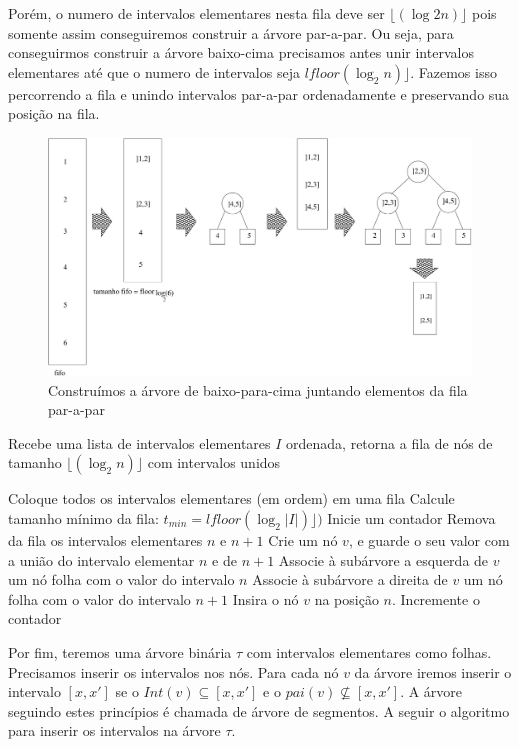 Porém, o numero de intervalos elementares nesta fila deve ser $\lfloor(\log{2}n)\rfloor$ pois somente assim conseguiremos construir a árvore par-a-par. Ou seja, para conseguirmos construir a árvore baixo-cima precisamos antes unir intervalos elementares até que o numero de intervalos seja $lfloor(\log_2{n})\rfloor$. Fazemos isso percorrendo a fila e unindo intervalos par-a-par ordenadamente e preservando sua posição na fila.

\begin{figure}[h!]
    \centering
    \includegraphics[scale=0.6]{images/fifo_update.pdf}
    \caption{Construímos a árvore de baixo-para-cima juntando elementos da fila par-a-par}
    \label{fig:my_label}
\end{figure}

\begin{algorithm}[h!]
    \caption{Recebe uma lista de intervalos elementares $I$ ordenada, retorna a fila de nós de tamanho $\lfloor(\log_2n)\rfloor$ com intervalos unidos}
    \begin{algorithmic}[1]
            \State Coloque todos os intervalos elementares (em ordem) em uma fila 
            \State Calcule tamanho mínimo da fila: $t_{min} = lfloor(\log_2{|I|})\rfloor)$
            \State Inicie um contador
                \State Remova da fila os intervalos elementares $n$ e $n+1$
                \State Crie um nó $v$, e guarde o seu valor com a união do intervalo elementar $n$ e de $n+1$
                \State Associe à subárvore a esquerda de $v$ um nó folha com o valor do intervalo $n$
                \State Associe à subárvore a direita de $v$ um nó folha com o valor do intervalo $n+1$
                \State Insira o nó $v$ na posição $n$.
                \State Incremente o contador
            \EndWhile
        \EndFunction
    \end{algorithmic}
\end{algorithm}
 Por fim, teremos uma árvore binária $\tau$ com intervalos elementares como folhas. Precisamos inserir os intervalos nos nós. Para cada nó $v$ da árvore iremos inserir o intervalo $[x, x']$ se o $Int(v) \subseteq [x, x']$ e o $pai(v) \nsubseteq [x, x']$. A árvore seguindo estes princípios é chamada de árvore de segmentos.  A seguir o algoritmo para inserir os intervalos na árvore $\tau$.
 
